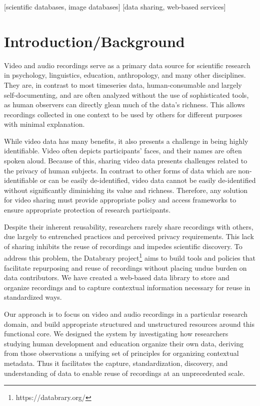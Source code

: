 \documentclass{sig-alternate}
\begin{document}
[scientific databases, image databases]
[data sharing, web-based services]



\section{Introduction/Background}

Video and audio recordings serve as a primary data source for scientific research in psychology, linguistics, education, anthropology, and many other disciplines.
They are, in contrast to most timeseries data, human-consumable and largely self-documenting, and are often analyzed without the use of sophisticated tools, as human observers can directly glean much of the data's richness.
This allows recordings collected in one context to be used by others for different purposes with minimal explanation.

While video data has many benefits, it also presents a challenge in being highly identifiable.
Video often depicts participants’ faces, and their names are often spoken aloud. 
Because of this, sharing video data presents challenges related to the privacy of human subjects. 
In contrast to other forms of data which are non-identifiable or can be easily de-identified, video data cannot be easily de-identified without significantly diminishing its value and richness. 
Therefore, any solution for video sharing must provide appropriate policy and access frameworks to ensure appropriate protection of research participants.

Despite their inherent reusability, researchers rarely share recordings with others, due largely to entrenched practices and perceived privacy requirements.
This lack of sharing inhibits the reuse of recordings and impedes scientific discovery.
To address this problem, the Databrary project\footnote{https://databrary.org/} aims to build tools and policies that facilitate repurposing and reuse of recordings without placing undue burden on data contributors.
We have created a web-based data library to store and organize recordings and to capture contextual information necessary for reuse in standardized ways.

Our approach is to focus on video and audio recordings in a particular research domain, and build appropriate structured and unstructured resources around this functional core.
We designed the system by investigating how researchers studying human development and education organize their own data, deriving from those observations a unifying set of principles for organizing contextual metadata.
Thus it facilitates the capture, standardization, discovery, and understanding of data to enable reuse of recordings at an unprecedented scale.
\end{document}
